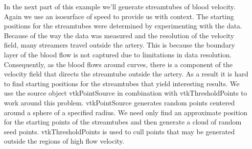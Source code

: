 In the next part of this example we'll generate streamtubes of blood velocity. Again we use an isosurface of speed to provide us with context. The starting positions for the streamtubes were determined by experimenting with the data. Because of the way the data was measured and the resolution of the velocity field, many streamers travel outside the artery. This is because the boundary layer of the blood flow is not captured due to limitations in data resolution. Consequently, as the blood flows around curves, there is a component of the velocity field that directs the streamtube outside the artery. As a result it is hard to find starting positions for the streamtubes that yield interesting results. We use the source object vtkPointSource in combination with vtkThresholdPoints to work around this problem. vtkPointSource generates random points centered around a sphere of a specified radius. We need only find an approximate position for the starting points of the streamtubes and then generate a cloud of random seed points. vtkThresholdPoints is used to cull points that may be generated outside the regions of high flow velocity.

